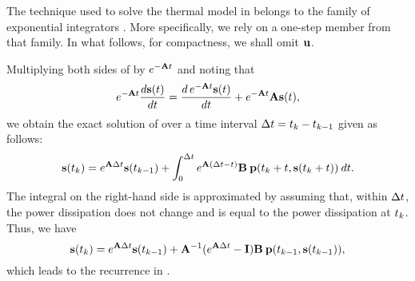 The technique used to solve the thermal model in  belongs to the family of exponential integrators \cite{hochbruck2010}.
More specifically, we rely on a one-step member from that family.
In what follows, for compactness, we shall omit $\mathbf{u}$.

Multiplying both sides of  by $e^{- \mathbf{A} t}$ and noting that
\[
  e^{-\mathbf{A} t} \frac{d\mathbf{s}(t)}{dt} = \frac{d\, e^{-\mathbf{A} t} \mathbf{s}(t)}{dt} + e^{-\mathbf{A} t} \mathbf{A} \mathbf{s}(t),
\]
we obtain the exact solution of  over a time interval $\Delta t = t_k - t_{k - 1}$ given as follows:
\[
  \mathbf{s}(t_k) = e^{\mathbf{A} \Delta t} \mathbf{s}(t_{k - 1}) + \int_0^{\Delta t} e^{\mathbf{A} (\Delta t - t)} \mathbf{B} \: \mathbf{p}(t_k + t, \mathbf{s}(t_k + t)) \: dt.
\]
The integral on the right-hand side is approximated by assuming that, within $\Delta t$, the power dissipation does not change and is equal to the power dissipation at $t_k$.
Thus, we have
\[
  \mathbf{s}(t_k) = e^{\mathbf{A} \Delta t} \mathbf{s}(t_{k - 1}) + \mathbf{A}^{-1}(e^{\mathbf{A} \Delta t} - \mathbf{I}) \mathbf{B} \: \mathbf{p}(t_{k - 1}, \mathbf{s}(t_{k - 1})),
\]
which leads to the recurrence in .
